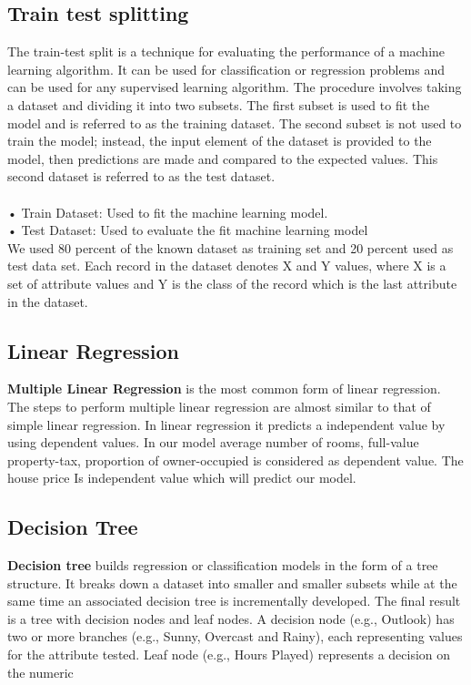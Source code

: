\documentclass[conference]{IEEEtran}
\begin{document}
\subsection{Train test splitting}
The train-test split is a technique for evaluating the performance of a machine learning algorithm.
It can be used for classification or regression problems and can be used for any supervised learning algorithm.
The procedure involves taking a dataset and dividing it into two subsets. The first subset is used to fit the model and is referred to as the training dataset. The second subset is not used to train the model; instead, the input element of the dataset is provided to the model, then predictions are made and compared to the expected values. This second dataset is referred to as the test dataset. \\
\\
•	Train Dataset: Used to fit the machine learning model. \\
•	Test Dataset: Used to evaluate the fit machine learning model\\
We used 80 percent of the known dataset as training set and 20 percent used as test data set. Each record in the dataset denotes X and Y values, where X is a set of attribute values and Y is the class of the record which is the last attribute in the dataset.

\subsection{Linear Regression}
\textbf{Multiple Linear Regression} is the most common form of linear regression. The steps to perform multiple linear regression are almost similar to that of simple linear regression. In linear regression it predicts a independent value by using dependent values. In our model average number of rooms, full-value property-tax, proportion of owner-occupied is considered as dependent value. The house price Is independent value which will predict our model. 


\subsection{Decision Tree}
\textbf{Decision tree} builds regression or classification models in the form of a tree structure. It breaks down a dataset into smaller and smaller subsets while at the same time an associated decision tree is incrementally developed. The final result is a tree with decision nodes and leaf nodes. A decision node (e.g., Outlook) has two or more branches (e.g., Sunny, Overcast and Rainy), each representing values for the attribute tested. Leaf node (e.g., Hours Played) represents a decision on the numeric
\end{document}
